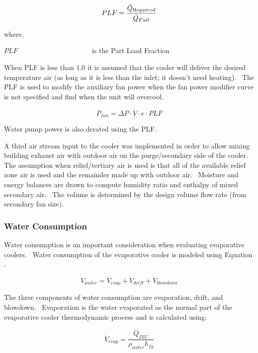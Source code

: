 \begin{equation}
PLF = \frac{{{{\dot Q}_{{\mathop{\rm Re}\nolimits} quired}}}}{{{{\dot Q}_{Full}}}}
\end{equation}

where,

\(PLF\) ~~~~~~~~~~~~~~~~~~~~ is the Part Load Fraction

When PLF is less than 1.0 it is assumed that the cooler will deliver the desired temperature air (as long as it is less than the inlet; it doesn't need heating).~ The PLF is used to modify the auxiliary fan power when the fan power modifier curve is not specified and find when the unit will overcool.

\begin{equation}
{P_{fan}} = \Delta P\cdot \dot V\cdot e\cdot PLF
\end{equation}

Water pump power is also derated using the PLF.

A third air stream input to the cooler was implemented in order to allow mixing building exhaust air with outdoor air on the purge/secondary side of the cooler. The assumption when relief/tertiary air is used is that all of the available relief zone air is used and the remainder made up with outdoor air.~ Moisture and energy balances are drawn to compute humidity ratio and enthalpy of mixed secondary air.~ The volume is determined by the design volume flow rate (from secondary fan size).

\subsubsection{Water Consumption}\label{water-consumption}

Water consumption is an important consideration when evaluating evaporative coolers.~ Water consumption of the evaporative cooler is modeled using Equation .

\begin{equation}
{\dot V_{water}} = {\dot V_{evap}} + {\dot V_{drift}} + {\dot V_{blowdown}}
\end{equation}

The three components of water consumption are evaporation, drift, and blowdown.~ Evaporation is the water evaporated as the normal part of the evaporative cooler thermodynamic process and is calculated using:

\begin{equation}
{\dot V_{evap}} = \frac{{{{\dot Q}_{IEC}}}}{{{\rho_{water}}{h_{fg}}}}
\end{equation}

